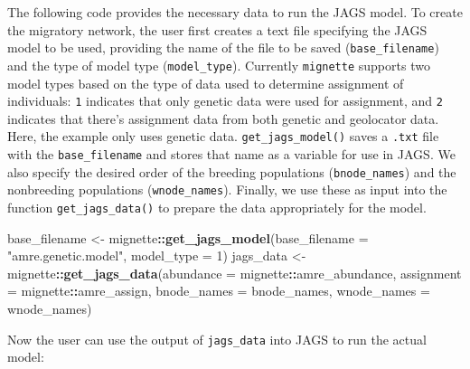 \documentclass[
]{book}
\newenvironment{Shaded}{\begin{snugshade}}{\end{snugshade}}
\newcommand{\AttributeTok}[1]{\textcolor[rgb]{0.13,0.29,0.53}{#1}}
\newcommand{\DecValTok}[1]{\textcolor[rgb]{0.00,0.00,0.81}{#1}}
\newcommand{\FunctionTok}[1]{\textcolor[rgb]{0.13,0.29,0.53}{\textbf{#1}}}
\newcommand{\NormalTok}[1]{#1}
\newcommand{\OtherTok}[1]{\textcolor[rgb]{0.56,0.35,0.01}{#1}}
\newcommand{\SpecialCharTok}[1]{\textcolor[rgb]{0.81,0.36,0.00}{\textbf{#1}}}
\newcommand{\StringTok}[1]{\textcolor[rgb]{0.31,0.60,0.02}{#1}}
\begin{document}
The following code provides the necessary data to run the JAGS model. To create the migratory network, the user first creates a text file specifying the JAGS model to be used, providing the name of the file to be saved (\texttt{base\_filename}) and the type of model type (\texttt{model\_type}). Currently \texttt{mignette} supports two model types based on the type of data used to determine assignment of individuals: \texttt{1} indicates that only genetic data were used for assignment, and \texttt{2} indicates that there's assignment data from both genetic and geolocator data. Here, the example only uses genetic data. \texttt{get\_jags\_model()} saves a \texttt{.txt} file with the \texttt{base\_filename} and stores that name as a variable for use in JAGS. We also specify the desired order of the breeding populations (\texttt{bnode\_names}) and the nonbreeding populations (\texttt{wnode\_names}). Finally, we use these as input into the function \texttt{get\_jags\_data()} to prepare the data appropriately for the model.

\begin{Shaded}
\begin{Highlighting}[]
\NormalTok{base\_filename }\OtherTok{\textless{}{-}}\NormalTok{ mignette}\SpecialCharTok{::}\FunctionTok{get\_jags\_model}\NormalTok{(}\AttributeTok{base\_filename =} \StringTok{"amre.genetic.model"}\NormalTok{, }\AttributeTok{model\_type =} \DecValTok{1}\NormalTok{)}
\NormalTok{jags\_data }\OtherTok{\textless{}{-}}\NormalTok{ mignette}\SpecialCharTok{::}\FunctionTok{get\_jags\_data}\NormalTok{(}\AttributeTok{abundance =}\NormalTok{ mignette}\SpecialCharTok{::}\NormalTok{amre\_abundance, }
                           \AttributeTok{assignment =}\NormalTok{ mignette}\SpecialCharTok{::}\NormalTok{amre\_assign,}
                           \AttributeTok{bnode\_names =}\NormalTok{ bnode\_names, }
                           \AttributeTok{wnode\_names =}\NormalTok{ wnode\_names)}
\end{Highlighting}
\end{Shaded}

Now the user can use the output of \texttt{jags\_data} into JAGS to run the actual model:
\end{document}
